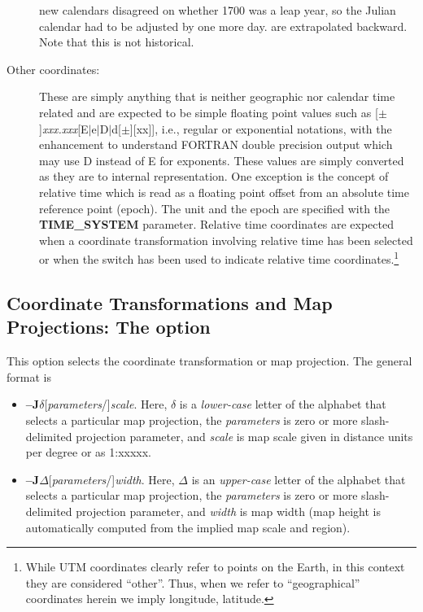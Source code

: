 \begin{description}
{new calendars disagreed on whether 1700 was a leap year, so the Julian calendar had to be adjusted by one more day.} are extrapolated
backward.  Note that this is not historical.
\item [Other coordinates:]  These are simply anything that is neither geographic nor calendar time related and are
expected to be simple floating point values such as [$\pm$]{\it xxx.xxx}[E$|$e$|$D$|$d[$\pm$][xx]], i.e., regular or exponential
notations, with the enhancement to understand FORTRAN double precision output which may use D instead of E for exponents.
These values are simply converted as they are to internal representation.  One exception is the concept
of relative time which is read as a floating point offset from an absolute time reference point (epoch).  The unit and the
epoch are specified with the {\bf TIME\_SYSTEM} parameter.  Relative time coordinates are expected when a coordinate transformation
involving relative time has been selected or when the  switch has been used to indicate relative time coordinates.\footnote{While
UTM coordinates clearly refer to points on the Earth, in this context they are considered ``other''.  Thus, when we
refer to ``geographical'' coordinates herein we imply longitude, latitude.}
\end{description}

\subsection{Coordinate Transformations and Map Projections: The  option}


This option selects the coordinate transformation or map projection.  The general format is

\begin{itemize}
\item {\bf --J}$\delta$[{\it parameters}/]{\it scale}.  Here, $\delta$ is a \emph{lower-case}
letter of the alphabet that selects a particular map projection, the {\it parameters}
is zero or more slash-delimited projection parameter, and {\it scale} is map scale given in
distance units per degree or as 1:xxxxx.
\item {\bf --J}$\Delta$[{\it parameters}/]{\it width}.  Here, $\Delta$ is an \emph{upper-case}
letter of the alphabet that selects a particular map projection, the {\it parameters}
is zero or more slash-delimited projection parameter, and {\it width} is map width (map
height is automatically computed from the implied map scale and region).
\end{itemize}

